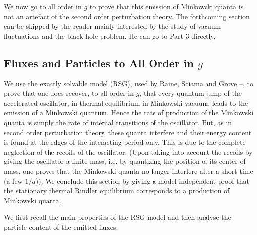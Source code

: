 We now go to all order in $g$ to prove that
this emission of Minkowski quanta is not an artefact of the second
order perturbation theory.
The forthcoming section can be skipped by the reader mainly interested by the
study of vacuum fluctuations and the black hole problem. He can
go to
Part 3 directly.

\subsection{Fluxes and Particles to All Order in $g$}\label{allg}

  We use the exactly solvable model (RSG), used by Raine, Sciama and Grove
\cite{RSG}--\cite{mpbrsg},
to prove that one does recover, to all
order in $g$, that every quantum jump of the
accelerated oscillator, in thermal equilibrium in Minkowski vacuum,
leads to the emission of a Minkowski quantum. Hence the rate of
production of the Minkowski quanta is simply the rate of internal
transitions of the oscillator. But, as in second order perturbation
theory, these quanta interfere
and their
energy
content is found
 at the edges of the interacting period
only. This is due to the complete neglection of the recoils of the oscillator.
(Upon taking into account the recoils by giving the oscillator a finite
mass, i.e. by quantizing the position of its center of mass,
one proves that the  Minkowski quanta
no longer interfere after a short time (a few $1/a$)\cite{Par}). We conclude
this section by giving a model independent proof that the
stationary thermal Rindler equilibrium corresponds to a
production of Minkowski quanta.

We first recall the main properties of the RSG model and then
analyse the particle content of
the emitted fluxes.

